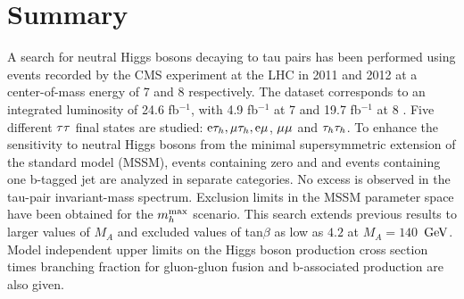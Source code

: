\clearpage

\section{Summary}
A search for neutral Higgs bosons decaying to tau pairs has been performed using events recorded by the CMS experiment at the LHC
in 2011 and 2012 at a center-of-mass energy of 7 \TeV and 8 \TeV respectively. The dataset corresponds to an integrated luminosity of 24.6 fb$^{-1}$, with 4.9 fb$^{-1}$ at 7 \TeV and 19.7 fb$^{-1}$ at 8 \TeV. Five different $\mathrm{\tau}\mathrm{\tau}$ final states are studied: $\mathrm{e}\mathrm{\tau}_{h}, \mathrm{\mu}\mathrm{\tau}_{h}, \mathrm{e}\mathrm{\mu}$, $\mathrm{\mu}\mathrm{\mu}$ and $\mathrm{\tau}_{h}\mathrm{\tau}_{h}$. 
To enhance the sensitivity to neutral Higgs bosons from the minimal supersymmetric extension of the standard model (MSSM), 
events containing zero and and events containing one b-tagged jet are analyzed in separate categories.
No excess is observed in the tau-pair invariant-mass spectrum. Exclusion limits in the MSSM parameter space have been obtained for the $m_h^{\rm max}$ scenario. This search extends previous results to larger values of $M_A$ and excluded values of tan$\beta$ as low as $4.2$ at $M_A=140$~$\mathrm{GeV}$. 
Model independent upper limits on the Higgs boson production cross section times branching fraction for gluon-gluon fusion and b-associated production are also given.





